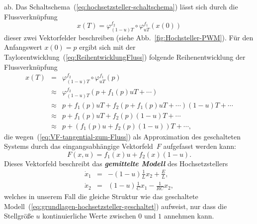 ab. Das Schaltschema~(\ref{eq:hochsetzsteller-schaltschema}) lässt
sich durch die Flussverknüpfung
\[
x(T)=\varphi_{(1-u)T}^{f_{2}}\circ\varphi_{uT}^{f_{1}}(x(0))
\]
dieser zwei Vektorfelder beschreiben (siehe Abb.~\ref{fig:Hochsteller-PWM}).
Für den Anfangswert $x(0)=p$ ergibt sich mit der Taylorentwicklung~(\ref{eq:ReihentwicklungFluss})
folgende Reihenentwicklung der Flussverknüpfung
\begin{eqnarray*}
x(T) & = & \varphi_{(1-u)T}^{f_{2}}\circ\varphi_{uT}^{f_{1}}(p)\\
 & \approx & \varphi_{(1-u)T}^{f_{2}}(p+f_{1}(p)uT+\cdots)\\
 & \approx & p+f_{1}(p)uT+f_{2}(p+f_{1}(p)uT+\cdots)(1-u)T+\cdots\\
 & \approx & p+f_{1}(p)uT+f_{2}(p)(1-u)T+\cdots\\
 & \approx & p+\left(f_{1}(p)u+f_{2}(p)(1-u)\right)T+\cdots,
\end{eqnarray*}
die wegen~(\ref{eq:VF-tangential-zum-Fluss}) als Approximation des
geschalteten Systems durch das eingangsabhängige Vektorfeld~$F$
aufgefasst werden kann:
\[
F(x,u)=f_{1}(x)u+f_{2}(x)(1-u).
\]
Dieses Vektorfeld beschreibt das \textbf{\em gemittelte Modell }des Hochsetzstellers
\begin{equation}
\begin{array}{lcl}
\dot{x}_{1} & = & -(1-u)\frac{1}{L}x_{2}+\frac{E}{L},\\
\dot{x}_{2} & = & (1-u)\frac{1}{C}x_{1}-\frac{1}{RC}x_{2},
\end{array}\label{eq:grundlagen-hochsetzsteller-gemittelt}
\end{equation}
welches in unserem Fall die gleiche Struktur wie das geschaltete Modell~(\ref{eq:grundlagen-hochsetzsteller-geschaltet})
aufweist, nur dass die Stellgröße $u$ kontinuierliche Werte zwischen
$0$ und $1$ annehmen kann.



